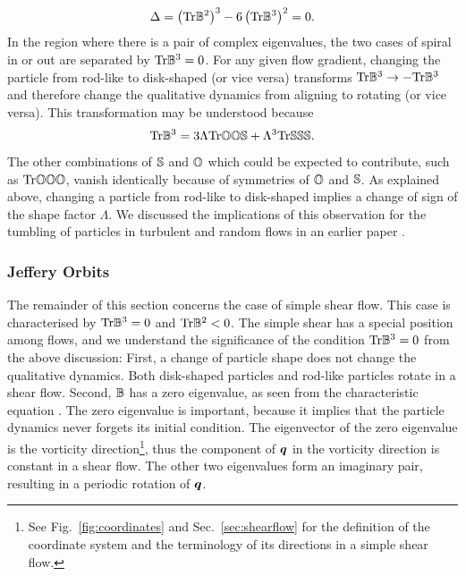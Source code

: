 \documentclass[thesis.tex]{subfiles}
\begin{document}
\begin{align}
 	\Delta = \left(\mbox{Tr} \mathbb{B}^2\right)^3 - 6\left(\mbox{Tr} \mathbb{B}^3\right)^2 = 0.
 \end{align} 
In the region where there is a pair of complex eigenvalues, the two cases of spiral in or out are separated by $\mbox{Tr} \mathbb{B}^3=0$. For any given flow gradient, changing the particle from rod-like to disk-shaped (or vice versa) transforms $\mbox{Tr} \mathbb{B}^3\to-\mbox{Tr}\mathbb{B}^3$ and therefore change the qualitative dynamics from aligning to rotating (or vice versa). This transformation may be understood because
\begin{align}
	\mbox{Tr} \mathbb{B}^3 = 3\Lambda \mbox{Tr} \mathbb{O}\mathbb{O} \mathbb{S} + \Lambda^3 \mbox{Tr} \mathbb{S}\mathbb{S} \mathbb{S}.
\end{align}
The other combinations of $\mathbb{S}$ and $\mathbb{O}$ which could be expected to contribute, such as $\mbox{Tr} \mathbb{O}\mathbb{O} \mathbb{O}$, vanish identically because of symmetries of $\mathbb{O}$ and $\mathbb{S}$. As explained above, changing a particle from rod-like to disk-shaped implies a change of sign of the shape factor $\Lambda$. We discussed the implications of this observation for the tumbling of particles in turbulent and random flows in an earlier paper \cite{gustavsson2014}.

\subsubsection{Jeffery Orbits}

The remainder of this section concerns the case of simple shear flow. This case is characterised by $\mbox{Tr} \mathbb{B}^3=0$ and $\mbox{Tr} \mathbb{B}^2<0$. The simple shear has a special position among flows, and we understand the significance of the condition $\mbox{Tr}\mathbb{B}^3=0$ from the above discussion: First, a change of particle shape does not change the qualitative dynamics. Both disk-shaped particles and rod-like particles rotate in a shear flow. Second, $\mathbb{B}$ has a zero eigenvalue, as seen from the characteristic equation . The zero eigenvalue is important, because it implies that the particle dynamics never forgets its initial condition. The eigenvector of the zero eigenvalue is the vorticity direction\footnote{See Fig.~\ref{fig:coordinates} and Sec.~\ref{sec:shearflow} for the definition of the coordinate system and the terminology of its directions in a simple shear flow.}, thus the component of $\mbox{\boldmath$q$}$ in the vorticity direction is constant in a shear flow. The other two eigenvalues form an imaginary pair, resulting in a periodic rotation of $\mbox{\boldmath$q$}$.
\end{document}

